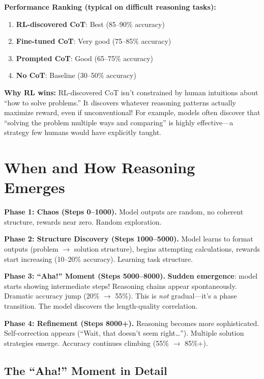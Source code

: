 \begin{chapterenv}
\begin{infobox}
\textbf{Performance Ranking (typical on difficult reasoning tasks):}

\begin{enumerate}[nosep]
    \item \textbf{RL-discovered CoT}: Best (85--90\% accuracy)
    \item \textbf{Fine-tuned CoT}: Very good (75--85\% accuracy)
    \item \textbf{Prompted CoT}: Good (65--75\% accuracy)
    \item \textbf{No CoT}: Baseline (30--50\% accuracy)
\end{enumerate}

\textbf{Why RL wins:} RL-discovered CoT isn't constrained by human intuitions about ``how to solve problems.'' It discovers whatever reasoning patterns actually maximize reward, even if unconventional! For example, models often discover that ``solving the problem multiple ways and comparing'' is highly effective---a strategy few humans would have explicitly taught.
\end{infobox}

\section{When and How Reasoning Emerges}

\textbf{Phase 1: Chaos (Steps 0--1000).} Model outputs are random, no coherent structure, rewards near zero. Random exploration.

\textbf{Phase 2: Structure Discovery (Steps 1000--5000).} Model learns to format outputs (problem $\to$ solution structure), begins attempting calculations, rewards start increasing (10--20\% accuracy). Learning task structure.

\textbf{Phase 3: ``Aha!'' Moment (Steps 5000--8000).} \textbf{Sudden emergence}: model starts showing intermediate steps! Reasoning chains appear spontaneously. Dramatic accuracy jump (20\% $\to$ 55\%). This is \textit{not} gradual---it's a phase transition. The model discovers the length-quality correlation.

\textbf{Phase 4: Refinement (Steps 8000+).} Reasoning becomes more sophisticated. Self-correction appears (``Wait, that doesn't seem right\ldots''). Multiple solution strategies emerge. Accuracy continues climbing (55\% $\to$ 85\%+).

\subsection{The ``Aha!'' Moment in Detail}


\end{chapterenv}
